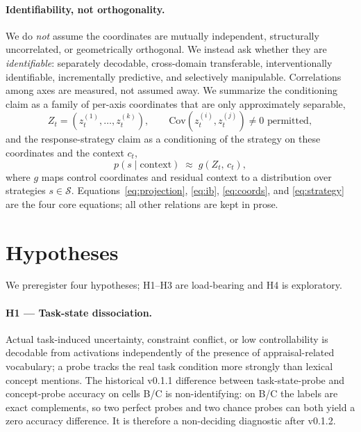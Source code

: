 \documentclass[11pt]{article}
\newcommand{\Zstate}{Z_t}
\begin{document}
\paragraph{Identifiability, not orthogonality.}
We do \emph{not} assume the coordinates are mutually independent, structurally
uncorrelated, or geometrically orthogonal. We instead ask whether they are
\emph{identifiable}: separately decodable, cross-domain transferable,
interventionally identifiable, incrementally predictive, and selectively
manipulable. Correlations among axes are measured, not assumed away. We summarize
the conditioning claim as a family of per-axis coordinates that are only
approximately separable,
\begin{equation}
\Zstate = (z_t^{(1)}, \dots, z_t^{(k)}), \qquad
\mathrm{Cov}(z_t^{(i)}, z_t^{(j)}) \neq 0 \text{ permitted},
\label{eq:coords}
\end{equation}
and the response-strategy claim as a conditioning of the strategy on these
coordinates and the context $c_t$,
\begin{equation}
p(s \mid \text{context}) \;\approx\; g\!\left(\Zstate,\, c_t\right),
\label{eq:strategy}
\end{equation}
where $g$ maps control coordinates and residual context to a distribution over
strategies $s \in \mathcal{S}$. Equations~\eqref{eq:projection}, \eqref{eq:ib},
\eqref{eq:coords}, and \eqref{eq:strategy} are the four core equations; all other
relations are kept in prose.

\section{Hypotheses}
\label{sec:hypotheses}

We preregister four hypotheses; H1--H3 are load-bearing and H4 is exploratory.

\paragraph{H1 --- Task-state dissociation.}
Actual task-induced uncertainty, constraint conflict, or low controllability is
decodable from activations independently of the presence of appraisal-related
vocabulary; a probe tracks the real task condition more strongly than lexical
concept mentions. The historical v0.1.1 difference between task-state-probe and
concept-probe accuracy on cells B/C is non-identifying: on B/C the labels are exact
complements, so two perfect probes and two chance probes can both yield a zero
accuracy difference. It is therefore a non-deciding diagnostic after v0.1.2.
\end{document}
